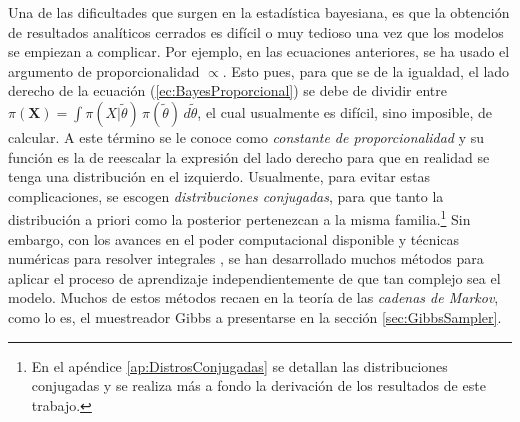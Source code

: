 \documentclass[../Main/Main.tex]{subfiles}
\begin{document}
Una de las dificultades que surgen en la estadística bayesiana, es que la obtención de resultados analíticos cerrados es difícil o muy tedioso una vez que los modelos se empiezan a complicar. Por ejemplo, en las ecuaciones anteriores, se ha usado el argumento de proporcionalidad $\propto$. Esto pues, para que se de la igualdad, el lado derecho de la ecuación (\ref{ec:BayesProporcional}) se debe de dividir entre $\pi(\mathbf{X}) = \int \pi(X|\tilde{\theta})\,\pi(\tilde{\theta})\,d\tilde{\theta}$, el cual usualmente es difícil, sino imposible, de calcular. A este término se le conoce como \textit{constante de proporcionalidad} y su función es la de reescalar la expresión del lado derecho para que en realidad se tenga una distribución en el izquierdo. Usualmente, para evitar estas complicaciones, se escogen \textit{distribuciones conjugadas}, para que tanto la distribución a priori como la posterior pertenezcan a la misma familia.\footnote{En el apéndice \ref{ap:DistrosConjugadas} se detallan las distribuciones conjugadas y se realiza más a fondo la derivación de los resultados de este trabajo.} Sin embargo, con los avances en el poder computacional disponible y técnicas numéricas para resolver integrales \autocite{robert2004monte}, se han desarrollado muchos métodos para aplicar el proceso de aprendizaje independientemente de que tan complejo sea el modelo. Muchos de estos métodos recaen en la teoría de las \textit{cadenas de Markov}, como lo es, el muestreador Gibbs a presentarse en la sección \ref{sec:GibbsSampler}. 
\end{document}
